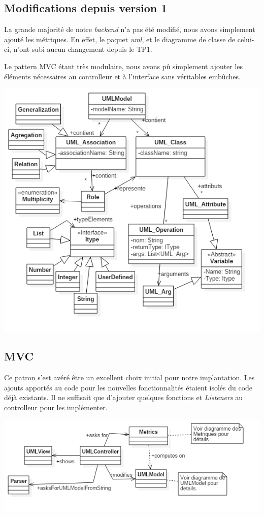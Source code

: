 \documentclass[letter,french]{report}
\begin{document}
  \subsection*{Modifications depuis version 1}

  La grande majorité de notre \emph{backend} n'a pas été modifié, nous avons
  simplement ajouté les métriques. En effet, le paquet \emph{uml}, et le
  diagramme de classe de celui-ci, n'ont subi aucun changement depuis le TP1.

  Le pattern MVC étant très modulaire, nous avons pû simplement ajouter les
  éléments nécessaires au controlleur et à l'interface sans véritables embûches.

	\includegraphics[scale=.5]{images/UML_diagram.png}

	\subsection*{MVC}
  Ce patron s'est avéré être un excellent choix initial pour notre implantation.
  Les ajouts apportés au code pour les nouvelles fonctionnalités étaient isolés
  du code déjà existants. Il ne suffisait que d'ajouter quelques fonctions et
  \emph{Listeners} au controlleur pour les implémenter.

	\includegraphics[scale=.5]{images/MVC_diagram.png}
	
\end{document}
